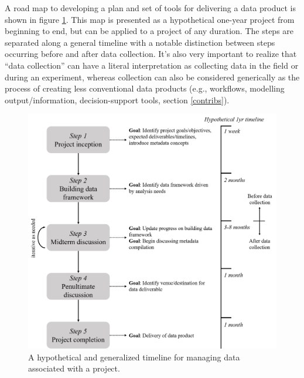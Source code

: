 \documentclass[
]{book}
\begin{document}
A road map to developing a plan and set of tools for delivering a data product is shown in figure \ref{fig:dataworkflow}. This map is presented as a hypothetical one-year project from beginning to end, but can be applied to a project of any duration. The steps are separated along a general timeline with a notable distinction between steps occurring before and after data collection. It's also very important to realize that ``data collection'' can have a literal interpretation as collecting data in the field or during an experiment, whereas collection can also be considered generically as the process of creating less conventional data products (e.g., workflows, modelling output/information, decision-support tools, section \ref{contribs}).

\begin{figure}

{\centering \includegraphics[width=1\linewidth]{img/dataworkflow} 

}

\caption{A hypothetical and generalized timeline for managing data associated with a project.}\label{fig:dataworkflow}
\end{figure}
\end{document}

